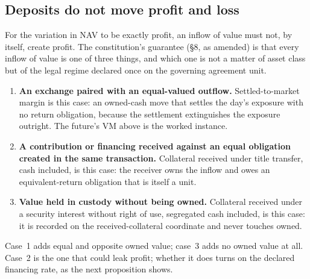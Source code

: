 \subsection{Deposits do not move profit and loss}

For the variation in NAV to be exactly profit, an inflow of value must not, by
itself, create profit. The constitution's guarantee (§8, as amended) is that
every inflow of value is one of three things, and which one is not a matter of
asset class but of the legal regime declared once on the governing agreement
unit.

\begin{enumerate}[label=(\arabic*),leftmargin=*]
\item \textbf{An exchange paired with an equal-valued outflow.}
  Settled-to-market margin is this case: an owned-cash move that settles the
  day's exposure with no return obligation, because the settlement
  extinguishes the exposure outright. The future's VM above is the worked
  instance.
\item \textbf{A contribution or financing received against an equal obligation
  created in the same transaction.} Collateral received under title transfer,
  cash included, is this case: the receiver owns the inflow and owes an
  equivalent-return obligation that is itself a unit.
\item \textbf{Value held in custody without being owned.} Collateral received
  under a security interest without right of use, segregated cash included, is
  this case: it is recorded on the received-collateral coordinate and never
  touches owned.
\end{enumerate}

Case~1 adds equal and opposite owned value; case~3 adds no owned value at all.
Case~2 is the one that could leak profit; whether it does turns on the declared
financing rate, as the next proposition shows.

